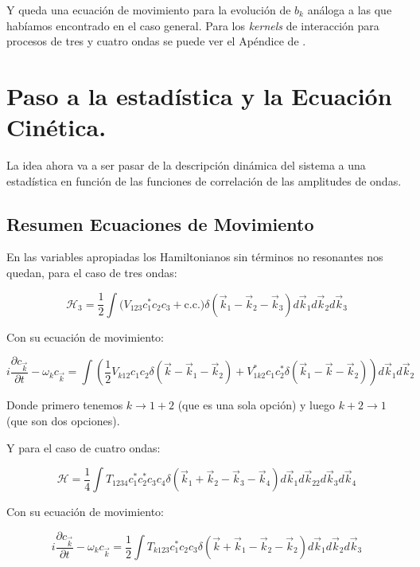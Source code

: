 Y queda una ecuación de movimiento para la evolución de $b_k$ análoga a las que habíamos encontrado en el caso general. Para los \textit{kernels} de interacción para procesos de tres y cuatro ondas se puede ver el Apéndice de \cite{meiTheoryApplicationsOcean2016}.


\section{Paso a la estadística y la Ecuación Cinética.}
La idea ahora va a ser pasar de la descripción dinámica del sistema a una estadística en función de las funciones de correlación de las amplitudes de ondas.

\subsection*{Resumen Ecuaciones de Movimiento}
En las variables apropiadas los Hamiltonianos sin términos no resonantes nos quedan, para el caso de tres ondas: 


\begin{equation}
	\mathcal{H}_3 = \frac{1}{2}\int \big(V_{123}c_1^*c_2c_3 + \text{c.c.}\big)\delta(\vec k_1-\vec k_2-\vec k_3)d\vec k_1 d\vec k_2 d\vec k_3
\end{equation}

Con su ecuación de movimiento:

\begin{equation}
	i\frac{\partial c_{\vec k}}{\partial t} - \omega_k c_{\vec k} = \int \left(\frac{1}{2}V_{k12}c_1c_2\delta(\vec k - \vec k_1 -\vec k_2) + V^*_{1k2}c_1c_2^*\delta(\vec k_1 -\vec k-\vec k_2)\right)d\vec k_1d\vec k_2
	\label{eq:motion_equation_three_waves}
\end{equation}

Donde primero tenemos $k\rightarrow1+2$ (que es una sola opción) y luego $k+2\rightarrow1$ (que son dos opciones).

Y para el caso de cuatro ondas:

\begin{equation}
	\mathcal{H} = \frac{1}{4}\int T_{1234}c_1^*c_2^*c_3c_4\delta(\vec k_1+\vec k_2-\vec k_3-\vec k_4)d\vec k_1 d\vec k_22 d\vec k_3 d\vec k_4
\end{equation}

Con su ecuación de movimiento:

\begin{equation}
	i\frac{\partial c_{\vec k}}{\partial t} - \omega_k c_{\vec k} = \frac{1}{2} \int T_{k123}c_1^*c_2c_3\delta(\vec k+\vec k_1-\vec k_2-\vec k_2) d\vec k_1 d\vec k_2d\vec k_3
\end{equation}

